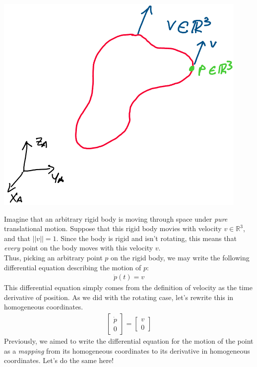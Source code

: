 \documentclass[oneside]{book}
\begin{document}
\begin{center}
    \includegraphics[scale=0.4]{images/translating_rb.png}
\end{center}
Imagine that an arbitrary rigid body is moving through space under \textit{pure} translational motion. Suppose that this rigid body movies with velocity $v \in \mathbb{R}^3$, and that $||v|| = 1$. Since the body is rigid and isn't rotating, this means that \textit{every} point on the body moves with this velocity $v$.\\
Thus, picking an arbitrary point $p$ on the rigid body, we may write the following differential equation describing the motion of $p$:
\begin{align}
    \dot{p}(t) = v
\end{align}
This differential equation simply comes from the definition of velocity as the time derivative of position. As we did with the rotating case, let's rewrite this in homogeneous coordinates.
\begin{align}
    \begin{bmatrix}
    \dot{p}\\
    0
    \end{bmatrix}
    = 
    \begin{bmatrix}
    v\\
    0
    \end{bmatrix}
\end{align}
Previously, we aimed to write the differential equation for the motion of the point as a \textit{mapping} from its homogeneous coordinates to its derivative in homogeneous coordinates. Let's do the same here!\\
\end{document}
